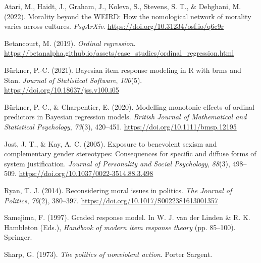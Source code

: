 \documentclass[12pt, letterpaper]{article}
\newenvironment{CSLReferences}[2]{}{}
\begin{document}
\hypertarget{refs}{}
\begin{CSLReferences}{1}{0}
\leavevmode{}%
Atari, M., Haidt, J., Graham, J., Koleva, S., Stevens, S. T., \&
Dehghani, M. (2022). Morality beyond the {WEIRD}: How the nomological
network of morality varies across cultures. \emph{PsyArXiv}.
\url{https://doi.org/10.31234/osf.io/q6c9r}

\leavevmode{}%
Betancourt, M. (2019). \emph{Ordinal regression}.
\url{https://betanalpha.github.io/assets/case_studies/ordinal_regression.html}

\leavevmode{}%
Bürkner, P.-C. (2021). Bayesian item response modeling in {R} with brms
and {Stan}. \emph{Journal of Statistical Software}, \emph{100}(5).
\url{https://doi.org/10.18637/jss.v100.i05}

\leavevmode{}%
Bürkner, P.-C., \& Charpentier, E. (2020). Modelling monotonic effects
of ordinal predictors in {Bayesian} regression models. \emph{British
Journal of Mathematical and Statistical Psychology}, \emph{73}(3),
420--451. \url{https://doi.org/10.1111/bmsp.12195}

\leavevmode{}%
Jost, J. T., \& Kay, A. C. (2005). Exposure to benevolent sexism and
complementary gender stereotypes: Consequences for specific and diffuse
forms of system justification. \emph{Journal of Personality and Social
Psychology}, \emph{88}(3), 498--509.
\url{https://doi.org/10.1037/0022-3514.88.3.498}

\leavevmode{}%
Ryan, T. J. (2014). Reconsidering moral issues in politics. \emph{The
Journal of Politics}, \emph{76}(2), 380--397.
\url{https://doi.org/10.1017/S0022381613001357}

\leavevmode{}%
Samejima, F. (1997). Graded response model. In W. J. van der Linden \&
R. K. Hambleton (Eds.), \emph{Handbook of modern item response theory}
(pp. 85--100). Springer.

\leavevmode{}%
Sharp, G. (1973). \emph{The politics of nonviolent action}. Porter
Sargent.

\end{CSLReferences}

\endgroup
\end{document}
